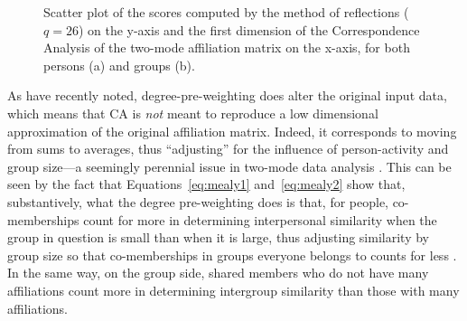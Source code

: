 \documentclass[a4paper,fleqn]{cas-sc}
\begin{document}
\begin{figure}
\begin{subfigure}[b]{0.45\textwidth}
            \caption{}
            \label{fig:g-ca-ref}
    \end{subfigure}
    \caption{Scatter plot of the scores computed by the method of reflections ($q = 26$) on the y-axis and the first dimension of the Correspondence Analysis of the two-mode affiliation matrix on the x-axis, for both persons (a) and groups (b). }
    \label{fig:ca-ref-corr}
\end{figure}

As \citet{desposito2014comparison} have recently noted, degree-pre-weighting does alter the original input data, which means that CA is \textit{not} meant to reproduce a low dimensional approximation of the original affiliation matrix. Indeed, it corresponds to moving from sums to averages, thus ``adjusting'' for the influence of person-activity and group size---a seemingly perennial issue in two-mode data analysis \citep[159ff]{bonacich1991simultaneous}. This can be seen by the fact that Equations~\ref{eq:mealy1} and~\ref{eq:mealy2} show that, substantively, what the degree pre-weighting does is that, for people, co-memberships count for more in determining interpersonal similarity when the group in question is small than when it is large, thus adjusting similarity by group size so that co-memberships in groups everyone belongs to counts for less \citep{ragozini2014correspondence}. In the same way, on the group side, shared members who do not have many affiliations count more in determining intergroup similarity than those with many affiliations. 
\end{document}
